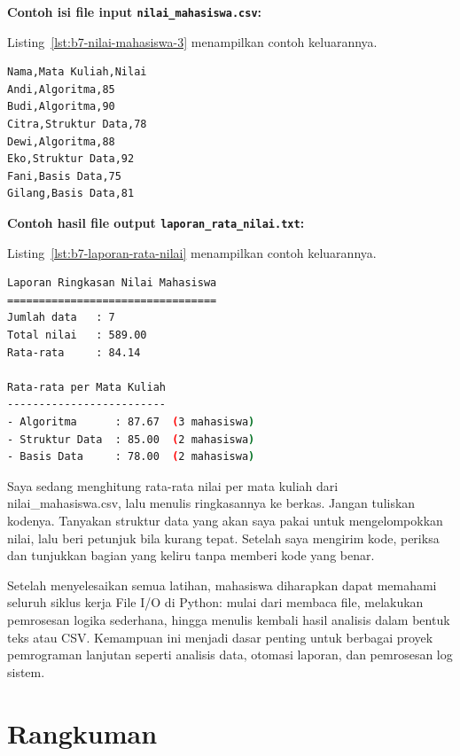 \begin{enumerate}
\noindent\textbf{Contoh isi file input \texttt{nilai\_mahasiswa.csv}:}

Listing~\ref{lst:b7-nilai-mahasiswa-3} menampilkan contoh keluarannya.

\begin{lstlisting}[language=bash, caption={Cuplikan isi file nilai_mahasiswa.csv}, label={lst:b7-nilai-mahasiswa-3}]
Nama,Mata Kuliah,Nilai
Andi,Algoritma,85
Budi,Algoritma,90
Citra,Struktur Data,78
Dewi,Algoritma,88
Eko,Struktur Data,92
Fani,Basis Data,75
Gilang,Basis Data,81
\end{lstlisting}

\noindent\textbf{Contoh hasil file output \texttt{laporan\_rata\_nilai.txt}:}

Listing~\ref{lst:b7-laporan-rata-nilai} menampilkan contoh keluarannya.

\begin{lstlisting}[language=bash, caption={Isi file laporan_rata_nilai.txt yang dihasilkan}, label={lst:b7-laporan-rata-nilai}]
Laporan Ringkasan Nilai Mahasiswa
=================================
Jumlah data   : 7
Total nilai   : 589.00
Rata-rata     : 84.14

Rata-rata per Mata Kuliah
-------------------------
- Algoritma      : 87.67  (3 mahasiswa)
- Struktur Data  : 85.00  (2 mahasiswa)
- Basis Data     : 78.00  (2 mahasiswa)
\end{lstlisting}

  \begin{promptterarah}
  Saya sedang menghitung rata-rata nilai per mata kuliah dari nilai\_mahasiswa.csv, lalu menulis ringkasannya ke berkas. Jangan tuliskan kodenya. Tanyakan struktur data yang akan saya pakai untuk mengelompokkan nilai, lalu beri petunjuk bila kurang tepat. Setelah saya mengirim kode, periksa dan tunjukkan bagian yang keliru tanpa memberi kode yang benar.
  \end{promptterarah}
\end{enumerate}

Setelah menyelesaikan semua latihan, mahasiswa diharapkan dapat memahami seluruh siklus kerja File I/O di Python:  
mulai dari membaca file, melakukan pemrosesan logika sederhana, hingga menulis kembali hasil analisis dalam bentuk teks atau CSV.  
Kemampuan ini menjadi dasar penting untuk berbagai proyek pemrograman lanjutan seperti analisis data, otomasi laporan, dan pemrosesan log sistem.


\section{Rangkuman}

